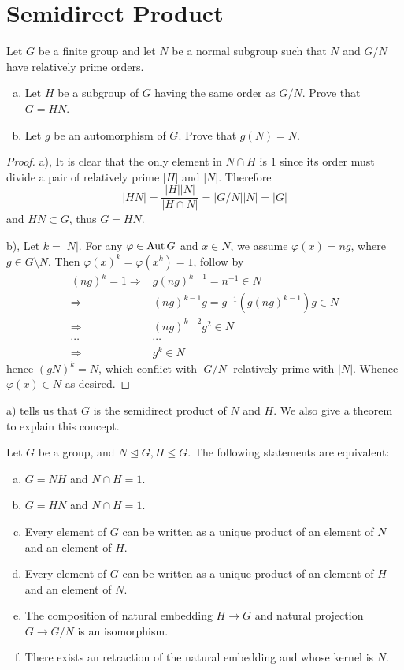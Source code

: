 \newpage\section{Semidirect Product}
\begin{ex}\label{1.2}
  Let $G$ be a finite group and let $N$ be a normal subgroup such that $N$ and $G/N$ have relatively prime orders.
  \begin{enumerate}[a)]
    \setlength{\itemindent}{2ex}
    \item Let $H$ be a subgroup of $G$ having the same order as $G/N$. Prove that $G=HN$.
    \item Let $g$ be an automorphism of $G$. Prove that $g(N)=N$.
  \end{enumerate}
\end{ex}
\begin{proof}
  a), It is clear that the only element in $N\cap H$ is $1$ since its order must divide a pair of relatively prime $|H|$ and $|N|$. Therefore
  \begin{equation*}
    |HN|=\frac{|H||N|}{|H\cap N|}=|G/N||N|=|G|
  \end{equation*}
  and $HN\subset G$, thus $G=HN$.

  b), Let $k=|N|$. For any $\varphi\in\operatorname{Aut} G$ and $x\in N$, we assume $\varphi(x)=ng$, where $g\in G\setminus N$. Then $\varphi(x)^k=\varphi(x^k)=1$, follow by
  \begin{align*}
    (ng)^k=1 \Rightarrow& g(ng)^{k-1}=n^{-1}\in N \\
    \Rightarrow& (ng)^{k-1}g=g^{-1}(g(ng)^{k-1})g\in N \\
    \Rightarrow& (ng)^{k-2}g^2\in N \\
    \cdots&\cdots \\
    \Rightarrow& g^k\in N
  \end{align*}
  hence $(gN)^k=N$, which conflict with $|G/N|$ relatively prime with $|N|$. Whence $\varphi(x)\in N$ as desired.
\end{proof}
a) tells us that $G$ is the semidirect product of $N$ and $H$. We also give a theorem to explain this concept.
\begin{thm}
  Let $G$ be a group, and $N\trianglelefteq G, H\leqslant G$. The following statements are equivalent:
  \begin{enumerate}[a)]
    \setlength{\itemindent}{2ex}
    \item $G=NH$ and $N\cap H=1$.
    \item $G=HN$ and $N\cap H=1$.
    \item Every element of $G$ can be written as a unique product of an element of $N$ and an element of $H$.
    \item Every element of $G$ can be written as a unique product of an element of $H$ and an element of $N$.
    \item The composition of natural embedding $H\to G$ and natural projection $G\to G/N$ is an isomorphism.
    \item There exists an retraction of the natural embedding and whose kernel is $N$.
  \end{enumerate}
\end{thm}
